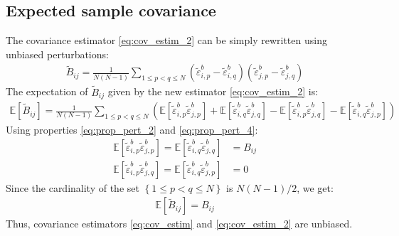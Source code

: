 \documentclass[12pt]{scrartcl}
\begin{document}
\subsection{Expected sample covariance}
The covariance estimator \eqref{eq:cov_estim_2} can be simply rewritten using unbiased perturbations:
\begin{align}
\widetilde{B}_{ij} = \frac{1}{N(N-1)} \sum_{1 \le p < q \le N} \left(\widetilde{\varepsilon}^b_{i,p} - \widetilde{\varepsilon}^b_{i,q}\right) \left(\widetilde{\varepsilon}^b_{j,p} - \widetilde{\varepsilon}^b_{j,q}\right)
\end{align}
The expectation of $\widetilde{B}_{ij}$ given by the new estimator \eqref{eq:cov_estim_2} is:
\begin{align}
\mathbb{E} \left[\widetilde{B}_{ij}\right] = \frac{1}{N(N-1)} \sum_{1 \le p < q \le N} \left(\mathbb{E} \left[\widetilde{\varepsilon}^b_{i,p} \widetilde{\varepsilon}^b_{j,p}\right] + \mathbb{E} \left[\widetilde{\varepsilon}^b_{i,q} \widetilde{\varepsilon}^b_{j,q}\right] - \mathbb{E} \left[\widetilde{\varepsilon}^b_{i,p} \widetilde{\varepsilon}^b_{j,q}\right] - \mathbb{E} \left[\widetilde{\varepsilon}^b_{i,q} \widetilde{\varepsilon}^b_{j,p}\right]\right)
\end{align}
Using properties \eqref{eq:prop_pert_2} and \eqref{eq:prop_pert_4}:
\begin{subequations}
\begin{align}
\label{eq:exp_pert_prod_1}
\mathbb{E} \left[\widetilde{\varepsilon}^b_{i,p} \widetilde{\varepsilon}^b_{j,p}\right] = \mathbb{E} \left[\widetilde{\varepsilon}^b_{i,q} \widetilde{\varepsilon}^b_{j,q}\right] & = B_{ij} \\
\label{eq:exp_pert_prod_2}
\mathbb{E} \left[\widetilde{\varepsilon}^b_{i,p} \widetilde{\varepsilon}^b_{j,q}\right] = \mathbb{E} \left[\widetilde{\varepsilon}^b_{i,q} \widetilde{\varepsilon}^b_{j,p}\right] & = 0
\end{align}
\end{subequations}
Since the cardinality of the set $\left\{1 \le p < q \le N\right\}$ is $N(N-1)/2$, we get:
\begin{align}
\label{eq:exp_cov}
\mathbb{E} \left[\widetilde{B}_{ij}\right] = B_{ij}
\end{align}
Thus, covariance estimators \eqref{eq:cov_estim} and \eqref{eq:cov_estim_2} are unbiased.
\end{document}
